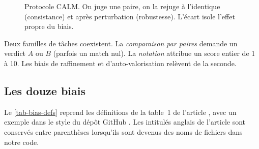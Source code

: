 \begin{figure}[htbp]
  \centering
  \caption{Protocole CALM. On juge une paire, on la rejuge à l'identique (consistance) et après perturbation (robustesse). L'écart isole l'effet propre du biais.}
  \label{fig-calm-protocol}
\end{figure}

Deux familles de tâches coexistent. La \emph{comparaison par paires} demande un verdict $A$ ou $B$ (parfois un match nul). La \emph{notation} attribue un score entier de 1 à 10. Les biais de raffinement et d'auto-valorisation relèvent de la seconde.

\subsection{Les douze biais}

Le \cref{tab-bias-defs} reprend les définitions de la table~1 de l'article \cite{ye2025justice}, avec un exemple dans le style du dépôt GitHub \cite{calmdataset}. Les intitulés anglais de l'article sont conservés entre parenthèses lorsqu'ils sont devenus des noms de fichiers dans notre code.

